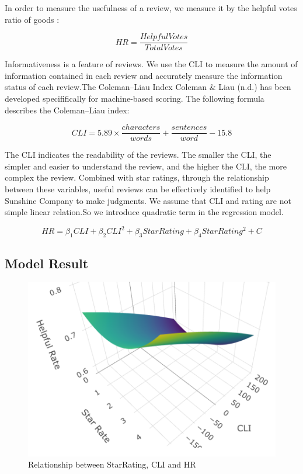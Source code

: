 \documentclass[12pt,a4paper,]{article}
\begin{document}
In order to measure the usefulness of a review, we measure it by the
helpful votes ratio of goods :

\begin{equation}
HR=\frac{HelpfulVotes}{TotalVotes}
\end{equation}

Informativeness is a feature of reviews. We use the CLI to measure the
amount of information contained in each review and accurately measure
the information status of each review.The Coleman--Liau Index Coleman \&
Liau (n.d.) has been developed specififically for machine-based scoring.
The following formula describes the Coleman--Liau index:

\begin{equation}
CLI=5.89\times\frac{characters}{words}+\frac{sentences}{word}-15.8
\end{equation}

The CLI indicates the readability of the reviews. The smaller the CLI,
the simpler and easier to understand the review, and the higher the CLI,
the more complex the review. Combined with star ratings, through the
relationship between these variables, useful reviews can be effectively
identified to help Sunshine Company to make judgments. We assume that
CLI and rating are not simple linear relation.So we introduce quadratic
term in the regression model.

\begin{equation}
HR=\beta_{1}CLI+\beta_{2}CLI^{2}+\beta_{3}StarRating+\beta_{4}StarRating^{2}+C
\end{equation}

\hypertarget{model-result}{%
\subsection{Model Result}\label{model-result}}

\begin{figure}

{\centering \includegraphics[width=0.6\linewidth]{3D} 

}

\caption{Relationship between StarRating, CLI and HR}\label{fig:unnamed-chunk-12}
\end{figure}
\end{document}

